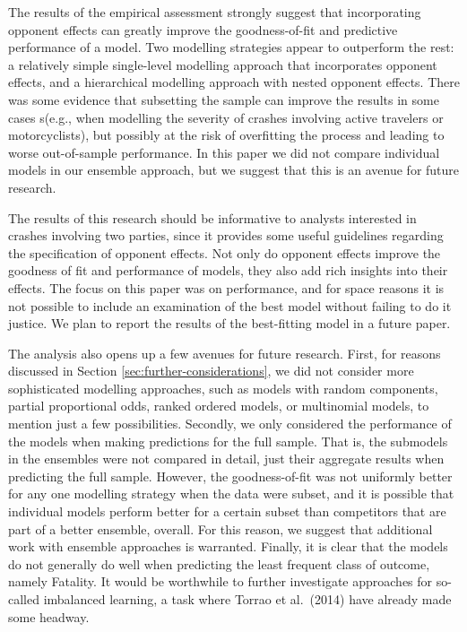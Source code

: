 \documentclass[]{elsarticle} %
\begin{document}
The results of the empirical assessment strongly suggest that
incorporating opponent effects can greatly improve the goodness-of-fit
and predictive performance of a model. Two modelling strategies appear
to outperform the rest: a relatively simple single-level modelling
approach that incorporates opponent effects, and a hierarchical
modelling approach with nested opponent effects. There was some evidence
that subsetting the sample can improve the results in some cases s(e.g.,
when modelling the severity of crashes involving active travelers or
motorcyclists), but possibly at the risk of overfitting the process and
leading to worse out-of-sample performance. In this paper we did not
compare individual models in our ensemble approach, but we suggest that
this is an avenue for future research.

The results of this research should be informative to analysts
interested in crashes involving two parties, since it provides some
useful guidelines regarding the specification of opponent effects. Not
only do opponent effects improve the goodness of fit and performance of
models, they also add rich insights into their effects. The focus on
this paper was on performance, and for space reasons it is not possible
to include an examination of the best model without failing to do it
justice. We plan to report the results of the best-fitting model in a
future paper.

The analysis also opens up a few avenues for future research. First, for
reasons discussed in Section \ref{sec:further-considerations}, we did
not consider more sophisticated modelling approaches, such as models
with random components, partial proportional odds, ranked ordered
models, or multinomial models, to mention just a few possibilities.
Secondly, we only considered the performance of the models when making
predictions for the full sample. That is, the submodels in the ensembles
were not compared in detail, just their aggregate results when
predicting the full sample. However, the goodness-of-fit was not
uniformly better for any one modelling strategy when the data were
subset, and it is possible that individual models perform better for a
certain subset than competitors that are part of a better ensemble,
overall. For this reason, we suggest that additional work with ensemble
approaches is warranted. Finally, it is clear that the models do not
generally do well when predicting the least frequent class of outcome,
namely Fatality. It would be worthwhile to further investigate
approaches for so-called imbalanced learning, a task where Torrao et
al.~(2014) have already made some headway.
\end{document}
